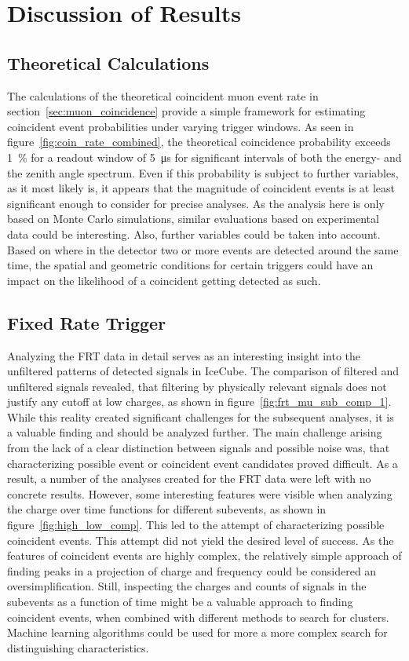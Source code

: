 \chapter{Discussion of Results}\label{chap:discussion}

\section{Theoretical Calculations}
The calculations of the theoretical coincident muon event rate in section~\ref{sec:muon_coincidence} provide a simple framework for estimating 
coincident event probabilities under varying trigger windows. As seen in figure~\ref{fig:coin_rate_combined}, the theoretical coincidence probability 
exceeds \SI{1}{\percent} for a readout window of \SI{5}{\micro\second} for significant intervals of both the energy- and the zenith angle spectrum. 
Even if this probability is subject to further variables, as it most likely is, it appears that the magnitude of coincident events is at least 
significant enough to consider for precise analyses. As the analysis here is only based on Monte Carlo simulations, similar evaluations based on 
experimental data could be interesting. Also, further variables could be taken into account.
Based on where in the detector two or more events are detected around the same time, the spatial and geometric conditions for certain triggers could have 
an impact on the likelihood of a coincident getting detected as such. 

\section{Fixed Rate Trigger}
Analyzing the FRT data in detail serves as an interesting insight into the unfiltered patterns of detected signals in IceCube. The comparison of filtered 
and unfiltered signals revealed, that filtering by physically relevant signals does not justify any cutoff at low charges, as shown in figure~\ref{fig:frt_mu_sub_comp_1}.
While this reality created significant challenges for the subsequent analyses, it is a valuable finding and should be analyzed further. 
The main challenge arising from the lack of a clear distinction between signals and possible noise was, that characterizing possible event or coincident event candidates 
proved difficult. As a result, a number of the analyses created for the FRT data were left with no concrete results. 
However, some interesting features were visible when analyzing the charge over time functions for different subevents, as shown in figure~\ref{fig:high_low_comp}.
This led to the attempt of characterizing possible coincident events. This attempt did not yield the desired level of success. As the features of coincident events 
are highly complex, the relatively simple approach of finding peaks in a projection of charge and frequency could be considered an oversimplification.
Still, inspecting the charges and counts of signals in the subevents as a function of time might be a valuable approach to finding coincident events, when combined
with different methods to search for clusters. Machine learning algorithms could be used for more a more complex search for distinguishing characteristics.

